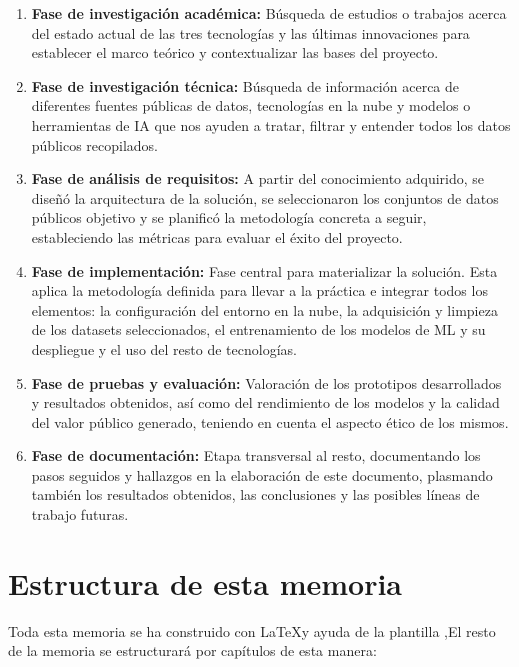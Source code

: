 \begin{enumerate}
	
	\item \textbf{Fase de investigación académica:} Búsqueda de estudios o trabajos acerca del estado actual de las tres tecnologías y las últimas innovaciones para establecer el marco teórico y contextualizar las bases del proyecto.
	
	\item \textbf{Fase de investigación técnica:} Búsqueda de información acerca de diferentes fuentes públicas de datos,  tecnologías en la nube y modelos o herramientas de IA que nos ayuden a tratar, filtrar y entender todos los datos públicos recopilados.
	
	\item \textbf{Fase de análisis de requisitos:} A partir del conocimiento adquirido, se diseñó la arquitectura de la solución, se seleccionaron los conjuntos de datos públicos objetivo y se planificó la metodología concreta a seguir, estableciendo las métricas para evaluar el éxito del proyecto.
	
	\item \textbf{Fase de implementación:} Fase central para materializar la solución. Esta aplica la metodología definida para llevar a la práctica e integrar todos los elementos: la configuración del entorno en la nube, la adquisición y limpieza de los datasets seleccionados, el entrenamiento de los modelos de ML y su despliegue y el uso del resto de tecnologías.
	
	\item \textbf{Fase de pruebas y evaluación:} Valoración de los prototipos desarrollados y resultados obtenidos, así como del rendimiento de los modelos y la calidad del valor público generado, teniendo en cuenta el aspecto ético de los mismos.
	
	\item \textbf{Fase de documentación:} Etapa transversal al resto, documentando los pasos seguidos y hallazgos en la elaboración de este documento, plasmando también los resultados obtenidos, las conclusiones y las posibles líneas de trabajo futuras.
\end{enumerate}

\section{Estructura de esta memoria}

Toda esta memoria se ha construido con \LaTeX\space y ayuda de la plantilla \texis,\space El resto de la memoria se estructurará por capítulos de esta manera:

